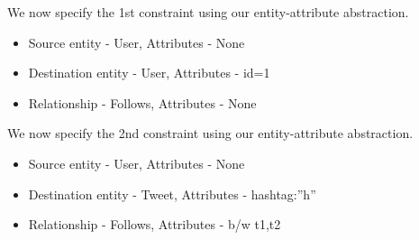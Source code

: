 \documentclass[letterpaper,10pt,english]{sphinxmanual}
\begin{document}
We now specify the 1st constraint using our entity-attribute abstraction.
\begin{itemize}
\item {} 
Source entity - User, Attributes - None

\item {} 
Destination entity - User, Attributes - id=1

\item {} 
Relationship - Follows, Attributes - None

\end{itemize}

We now specify the 2nd constraint using our entity-attribute abstraction.
\begin{itemize}
\item {} 
Source entity - User, Attributes - None

\item {} 
Destination entity - Tweet, Attributes - hashtag:”h”

\item {} 
Relationship - Follows, Attributes - b/w t1,t2

\end{itemize}
\end{document}
